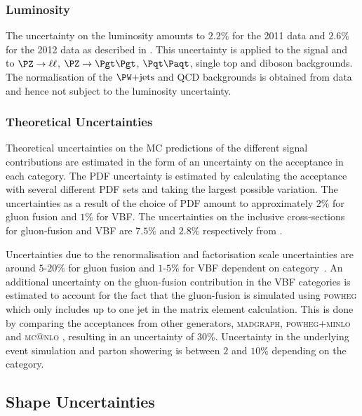 \subsubsection{\textbf{Luminosity}} 
The uncertainty on the luminosity amounts to $2.2\%$ for the 2011 data and
$2.6\%$ for the 2012 data as described in \cite{CMS-PAS-SMP-12-008,CMS-PAS-LUM-13-001}.
This uncertainty is applied to the signal and to $\PZ \to \ell\ell$, $\PZ \to
\Pgt\Pgt$, $\ttbar$, single top and diboson backgrounds. 
The normalisation of the $\WJets$ and QCD backgrounds is obtained from data and hence not subject to the luminosity uncertainty.

\subsubsection{\textbf{Theoretical Uncertainties}} 
Theoretical uncertainties on the \ac{MC} predictions of the different signal
contributions are estimated in the form of an uncertainty on the acceptance in
each category. The \ac{PDF} uncertainty is estimated by calculating the
acceptance with several different \ac{PDF} sets and taking the largest possible
variation. The uncertainties as a result of the choice of \ac{PDF} amount to
approximately $2\%$ for gluon fusion and $1\%$ for \ac{VBF}. The uncertainties
on the inclusive cross-sections for gluon-fusion and \ac{VBF} are $7.5\%$ and
$2.8\%$ respectively from
\cite{LHCHiggsCrossSectionWorkingGroup:2011ti,Dittmaier:2012vm,Heinemeyer:2013tqa}.

Uncertainties due to the renormalisation and factorisation scale uncertainties
are around $5$-$20\%$ for gluon fusion and $1$-$5\%$ for \ac{VBF} dependent on
category~\cite{HIG-13-004}. An additional uncertainty on the gluon-fusion contribution in the
VBF categories is estimated to account for the fact that the gluon-fusion is
simulated using \textsc{powheg} which only includes up to one jet in the matrix
element calculation. This is done by comparing the acceptances from other
generators, \textsc{madgraph}, \textsc{powheg+minlo} \cite{Hamilton:2012np} and
\textsc{mc@nlo} \cite{Frixione:2002ik}, resulting in an uncertainty of $30\%$.
Uncertainty in the underlying event simulation and parton showering is between
$2$ and $10\%$ depending on the category. 


\subsection{Shape Uncertainties}
\label{sec:systematicUncertainties_shape}

